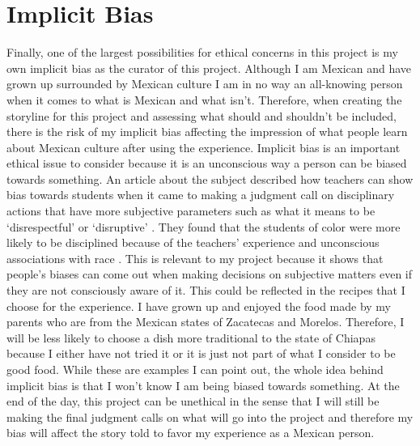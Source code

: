 \documentclass[11pt,twocolumn]{article}
\begin{document}
\section{Implicit Bias}
Finally, one of the largest possibilities for ethical concerns in this project is my own implicit bias as the curator of this project. Although I am Mexican and have grown up surrounded by Mexican culture I am in no way an all-knowing person when it comes to what is Mexican and what isn’t. Therefore, when creating the storyline for this project and assessing what should and shouldn’t be included, there is the risk of my implicit bias affecting the impression of what people learn about Mexican culture after using the experience. Implicit bias is an important ethical issue to consider because it is an unconscious way a person can be biased towards something. An article about the subject described how teachers can show bias towards students when it came to making a judgment call on disciplinary actions that have more subjective parameters such as what it means to be ‘disrespectful’ or ‘disruptive’ \cite{implicitbias201516}. They found that the students of color were more likely to be disciplined because of the teachers’ experience and unconscious associations with race \cite{implicitbias201516}. This is relevant to my project because it shows that people's biases can come out when making decisions on subjective matters even if they are not consciously aware of it. This could be reflected in the recipes that I choose for the experience. I have grown up and enjoyed the food made by my parents who are from the Mexican states of Zacatecas and Morelos. Therefore, I will be less likely to choose a dish more traditional to the state of Chiapas because I either have not tried it or it is just not part of what I consider to be good food. While these are examples I can point out, the whole idea behind implicit bias is that I won't know I am being biased towards something. At the end of the day, this project can be unethical in the sense that I will still be making the final judgment calls on what will go into the project and therefore my bias will affect the story told to favor my experience as a Mexican person. 
\end{document}
